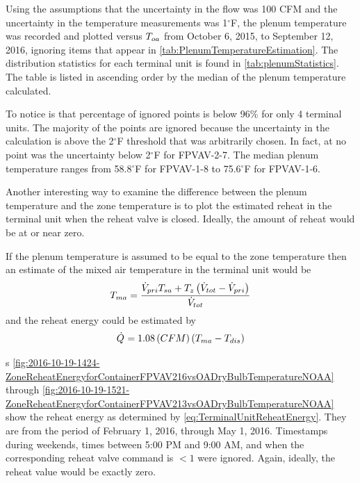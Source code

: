 Using the assumptions that the uncertainty in the flow was 100 CFM and
the uncertainty in the temperature measurements was 1\(^\circ\)F, the
plenum temperature was recorded and plotted versus \(T_{oa}\) from October
6, 2015, to September 12, 2016, ignoring items that appear in \tableref{}
\ref{tab:PlenumTemperatureEstimation}. The distribution statistics for
each terminal unit is found in \tableref{} \ref{tab:plenumStatistics}.
The table is listed in ascending order by the median of the plenum
temperature calculated.

To notice is that percentage of ignored points is below 96\% for only 4
terminal units.  The majority of the points are ignored because the
uncertainty in the calculation is above the 2\(^\circ\)F threshold that
was arbitrarily chosen.  In fact, at no point was the uncertainty below
2\(^\circ\)F for FPVAV-2-7.  The median plenum temperature ranges from
58.8\(^\circ\)F for FPVAV-1-8 to 75.6\(^\circ\)F for FPVAV-1-6.

Another interesting way to examine the difference between the plenum
temperature and the zone temperature is to plot the estimated reheat in
the terminal unit when the reheat valve is closed.  Ideally, the amount
of reheat would be at or near zero. 

If the plenum temperature is assumed to be equal to the zone temperature
then an estimate of the mixed air temperature in the terminal unit would
be
\begin{equation}
    T_{ma} = \frac{\dot{V}_{pri} T_{sa} + T_{z} \left( \dot{V}_{tot} - \dot{V}_{pri} \right) }{ \dot{V}_{tot}}
    \label{eq:TerminalUnitMixedAirTemp}
\end{equation}
and the reheat energy could be estimated by
\begin{equation}
    \dot{Q}_{} = 1.08 \left( CFM \right) \left( T_{ma} - T_{dis}  \right)
    \label{eq:TerminalUnitReheatEnergy}
\end{equation}

\figref{}s
\ref{fig:2016-10-19-1424-ZoneReheatEnergyforContainerFPVAV216vsOADryBulbTemperatureNOAA}
through
\ref{fig:2016-10-19-1521-ZoneReheatEnergyforContainerFPVAV213vsOADryBulbTemperatureNOAA}
show the reheat energy as determined by 
\ref{eq:TerminalUnitReheatEnergy}. They are from the period of February
1, 2016, through May 1, 2016.  Timestamps during weekends, times between
5:00 PM and 9:00 AM, and when the corresponding reheat valve command is
\( < 1 \) were ignored. Again, ideally, the reheat value would be
exactly zero.



